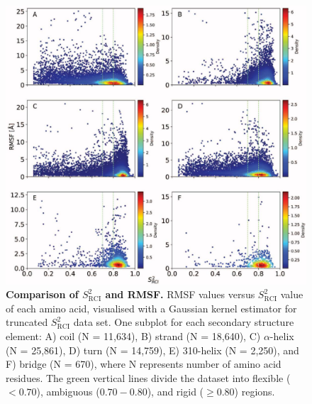 \begin{figure}[H]
    \centering
    \includegraphics[width=\linewidth]{pLDDT//plddt_figures//supplementary_bhawna/supfig17.pdf}
    \caption{\textbf{Comparison of $S_{\text{RCI}}^{2}$ and RMSF.} RMSF values versus $S_{\text{RCI}}^{2}$ value of each amino acid, visualised with a Gaussian kernel estimator for truncated $S_{\text{RCI}}^{2}$ data set. One subplot for each secondary structure element: A) coil (N = 11,634), B) strand (N = 18,640), C) $\alpha$-helix (N = 25,861), D) turn (N = 14,759), E) 310-helix (N = 2,250), and F) bridge (N = 670), where N represents number of amino acid residues. The green vertical lines divide the dataset into flexible ($<0.70$), ambiguous ($0.70 - 0.80$), and rigid ($\geq 0.80$) regions.}

    \label{fig:plddt_sup:sup17}
\end{figure}


